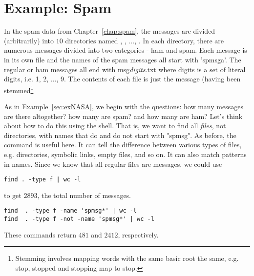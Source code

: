 \section{Example: Spam}
In the spam data \cite{lingspam} from Chapter~\ref{chap:spam}, the
messages are divided (arbitrarily) into $10$ directories named
, , $\ldots$, .
In each directory, there are numerous messages divided into two
categories - ham and spam.  Each message is in its own file and the
names of the spam messages all start with 'spmsga'.  The regular or
ham messages all end with msg\textit{digits}.txt where digits is a set
of literal digits, i.e. 1, 2, $\ldots$, 9.
The contents of each file is just the message (having been
stemmed\footnote{Stemming involves mapping words with the same basic
  root the same, e.g. stop, stopped and stopping map to stop.}

As in Example~\ref{sec:exNASA}, we begin with the questions: how many
messages are there altogether?  how many are spam? and how many are ham?
Let's think about how to do this using the shell.
That is, we want to find all \textit{files}, not directories, with
names that do and do not start with "spmsg".  As before, the
 command is useful here.  It can tell the difference between various types of files, e.g.
directories, symbolic links, empty files, and so on.  It can also
match patterns in names.
Since we know that all regular files are messages, we could use
\begin{verbatim}
find . -type f | wc -l
\end{verbatim}
to get $2893$, the total number of messages.  
\begin{verbatim}
find  . -type f -name 'spmsg*' | wc -l
find  . -type f -not -name 'spmsg*' | wc -l
\end{verbatim}
These commands return $481$ and $2412$, respectively.

